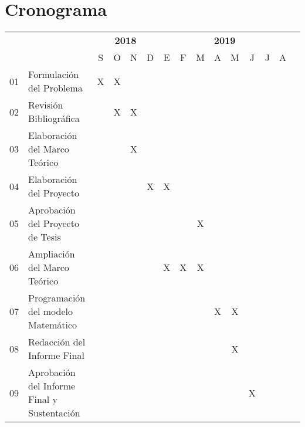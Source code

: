 \chapter{Cronograma}
\newpage

\begin{table}
	\centering
	\begin{turn}{90}
	\setlength{\tabcolsep}{8pt} %
	\renewcommand{\arraystretch}{1.6}
	
	\begin{tabular}{|c|m{4.5cm}|c|c|c|c|c|c|c|c|c|c|c|c|c|}
		\hline
		\hspace{0.6cm}\multirow{2}{1cm}{\textbf{N}}&\hspace{0.8cm}\multirow{2}{1cm}{\textbf{ACTIVIDADES}}&\multicolumn{4}{c|}{\textbf{2018}}&\multicolumn{8}{c|}{\textbf{2019}}\\ 
		\cline{3-14} 	
		&&S&O&N&D&E&F&M&A&M&J&J&A\\
		\hline
		01&\centering Formulación del Problema&X&X&&&&&&&&&&\\
		\hline
		02&\centering Revisión Bibliográfica&&X&X&&&&&&&&&\\
		\hline
		03&\centering Elaboración del Marco Teórico&&&X&&&&&&&&&\\
		\hline
		04&\centering Elaboración del Proyecto&&&&X&X&&&&&&&\\
		\hline
		05&\centering Aprobación del Proyecto de Tesis&&&&&&&X&&&&&\\
		\hline
		06&\centering Ampliación del Marco Teórico&&&&&X&X&X&&&&&\\
		\hline
		07&\centering Programación del modelo Matemático&&&&&&&&X&X&&&\\
		\hline
		08&\centering Redacción del Informe Final&&&&&&&&&X&&&\\
		\hline
		09&\centering Aprobación del Informe Final y Sustentación&&&&&&&&&&X&&\\
		\hline							
		\end{tabular}
		\end{turn}
		
	\end{table}